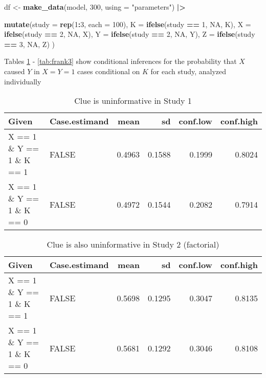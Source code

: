\documentclass[
  12pt,
]{book}
\newenvironment{Shaded}{\begin{snugshade}}{\end{snugshade}}
\newcommand{\AttributeTok}[1]{\textcolor[rgb]{0.13,0.29,0.53}{#1}}
\newcommand{\ConstantTok}[1]{\textcolor[rgb]{0.56,0.35,0.01}{#1}}
\newcommand{\DecValTok}[1]{\textcolor[rgb]{0.00,0.00,0.81}{#1}}
\newcommand{\FunctionTok}[1]{\textcolor[rgb]{0.13,0.29,0.53}{\textbf{#1}}}
\newcommand{\NormalTok}[1]{#1}
\newcommand{\OtherTok}[1]{\textcolor[rgb]{0.56,0.35,0.01}{#1}}
\newcommand{\SpecialCharTok}[1]{\textcolor[rgb]{0.81,0.36,0.00}{\textbf{#1}}}
\newcommand{\StringTok}[1]{\textcolor[rgb]{0.31,0.60,0.02}{#1}}
\begin{document}
\begin{Shaded}
\begin{Highlighting}[]
\NormalTok{df }\OtherTok{\textless{}{-}} \FunctionTok{make\_data}\NormalTok{(model, }\DecValTok{300}\NormalTok{, }\AttributeTok{using =} \StringTok{"parameters"}\NormalTok{) }\SpecialCharTok{|\textgreater{}}
  
      \FunctionTok{mutate}\NormalTok{(}\AttributeTok{study =} \FunctionTok{rep}\NormalTok{(}\DecValTok{1}\SpecialCharTok{:}\DecValTok{3}\NormalTok{, }\AttributeTok{each =} \DecValTok{100}\NormalTok{),}
             \AttributeTok{K =} \FunctionTok{ifelse}\NormalTok{(study }\SpecialCharTok{==} \DecValTok{1}\NormalTok{, }\ConstantTok{NA}\NormalTok{, K),}
             \AttributeTok{X =} \FunctionTok{ifelse}\NormalTok{(study }\SpecialCharTok{==} \DecValTok{2}\NormalTok{, }\ConstantTok{NA}\NormalTok{, X),}
             \AttributeTok{Y =} \FunctionTok{ifelse}\NormalTok{(study }\SpecialCharTok{==} \DecValTok{2}\NormalTok{, }\ConstantTok{NA}\NormalTok{, Y),}
             \AttributeTok{Z =} \FunctionTok{ifelse}\NormalTok{(study }\SpecialCharTok{==} \DecValTok{3}\NormalTok{, }\ConstantTok{NA}\NormalTok{, Z)}
\NormalTok{             )}
\end{Highlighting}
\end{Shaded}

Tables \ref{tab:frank1} - \ref{tab:frank3} show conditional inferences for the probability that \(X\) caused \(Y\) in \(X=Y=1\) cases conditional on \(K\) for each study, analyzed individually

\begin{table}

\caption{\label{tab:frank1}Clue is uninformative in Study 1}
\centering
\begin{tabular}[t]{l|l|r|r|r|r}
\hline
Given & Case.estimand & mean & sd & conf.low & conf.high\\
\hline
X == 1 \& Y == 1 \& K == 1 & FALSE & 0.4963 & 0.1588 & 0.1999 & 0.8024\\
\hline
X == 1 \& Y == 1 \& K == 0 & FALSE & 0.4972 & 0.1544 & 0.2082 & 0.7914\\
\hline
\end{tabular}
\end{table}

\begin{table}

\caption{\label{tab:frank2}Clue is also uninformative in Study 2 (factorial)}
\centering
\begin{tabular}[t]{l|l|r|r|r|r}
\hline
Given & Case.estimand & mean & sd & conf.low & conf.high\\
\hline
X == 1 \& Y == 1 \& K == 1 & FALSE & 0.5698 & 0.1295 & 0.3047 & 0.8135\\
\hline
X == 1 \& Y == 1 \& K == 0 & FALSE & 0.5681 & 0.1292 & 0.3046 & 0.8108\\
\hline
\end{tabular}
\end{table}
\end{document}
